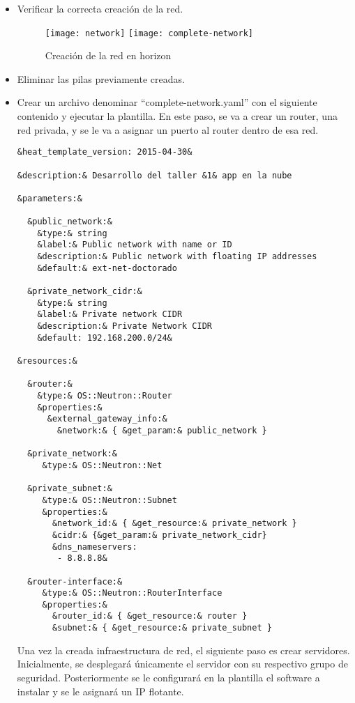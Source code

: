 \documentclass[10pt]{article}   			%
\begin{document}
\begin{itemize}
\item Verificar la correcta creación de la red.
\begin{figure}[ht] 
	\centering
		\texttt{[image: network]} 
 		\texttt{[image: complete-network]} 
	\caption{Creación de la red en horizon} \label{fig:Network}
\end{figure}

\item Eliminar las pilas previamente creadas.
\item Crear un archivo denominar “complete-network.yaml” con el siguiente contenido y ejecutar la plantilla. En este paso, se va a crear un router, una red privada, y se le va a asignar un puerto al router dentro de esa red.
\begin{small}
\begin{lstlisting}[frame=single,style=base]	
&heat_template_version: 2015-04-30&

&description:& Desarrollo del taller &1& app en la nube

&parameters:&

  &public_network:&
    &type:& string
    &label:& Public network with name or ID
    &description:& Public network with floating IP addresses
    &default:& ext-net-doctorado

  &private_network_cidr:&
    &type:& string
    &label:& Private network CIDR
    &description:& Private Network CIDR
    &default: 192.168.200.0/24&

&resources:&

  &router:&
    &type:& OS::Neutron::Router
    &properties:&
      &external_gateway_info:&
        &network:& { &get_param:& public_network }

  &private_network:&
     &type:& OS::Neutron::Net

  &private_subnet:&
     &type:& OS::Neutron::Subnet
     &properties:&
       &network_id:& { &get_resource:& private_network }
       &cidr:& {&get_param:& private_network_cidr}
       &dns_nameservers: 
        - 8.8.8.8&

  &router-interface:&
     &type:& OS::Neutron::RouterInterface
     &properties:&
       &router_id:& { &get_resource:& router }
       &subnet:& { &get_resource:& private_subnet }
\end{lstlisting}
\end{small}

Una vez la creada infraestructura de red, el siguiente paso es crear servidores. Inicialmente, se desplegará únicamente el servidor con su respectivo grupo de seguridad. Posteriormente se le configurará en la plantilla el software a instalar y se le asignará un IP flotante.


\end{itemize}
\end{document}

